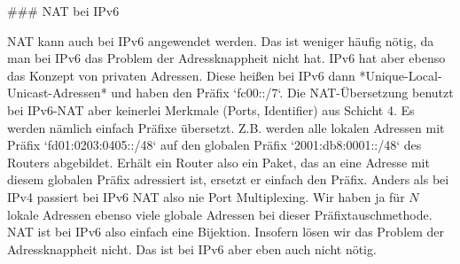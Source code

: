 ### NAT bei IPv6

NAT kann auch bei IPv6 angewendet werden. Das ist weniger häufig nötig, da man
bei IPv6 das Problem der Adressknappheit nicht hat. IPv6 hat aber ebenso das
Konzept von privaten Adressen. Diese heißen bei IPv6 dann
*Unique-Local-Unicast-Adressen* und haben den Präfix `fc00::/7`. Die
NAT-Übersetzung benutzt bei IPv6-NAT aber keinerlei Merkmale (Ports, Identifier)
aus Schicht 4. Es werden nämlich einfach Präfixe übersetzt. Z.B. werden alle
lokalen Adressen mit Präfix `fd01:0203:0405::/48` auf den globalen Präfix
`2001:db8:0001::/48` des Routers abgebildet. Erhält ein Router also ein Paket,
das an eine Adresse mit diesem globalen Präfix adressiert ist, ersetzt er
einfach den Präfix. Anders als bei IPv4 passiert bei IPv6 NAT also nie Port
Multiplexing. Wir haben ja für $N$ lokale Adressen ebenso viele globale Adressen
bei dieser Präfixtauschmethode. NAT ist bei IPv6 also einfach eine
Bijektion. Insofern lösen wir das Problem der Adressknappheit nicht. Das ist bei
IPv6 aber eben auch nicht nötig.
